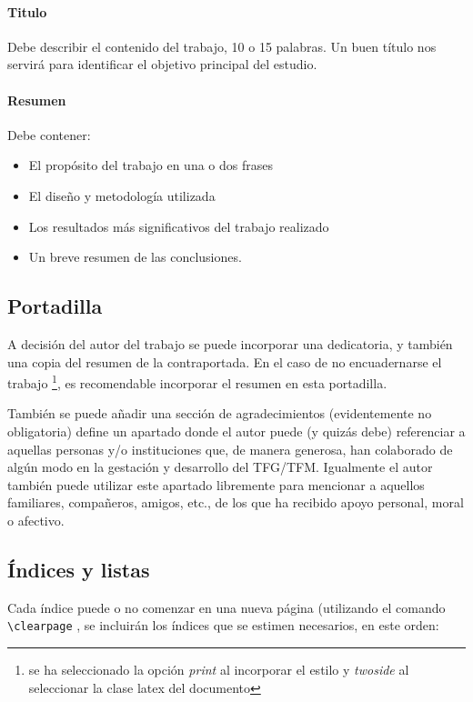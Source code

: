 \paragraph{Titulo}

Debe describir el contenido del trabajo, 10 o 15 palabras. Un buen título nos servirá para identificar el objetivo principal del estudio.

\paragraph{Resumen }
Debe contener:
\begin{itemize}
    \item El  propósito  del  trabajo  en  una  o  dos  frases
    \item El  diseño  y metodología  utilizada
    \item Los  resultados  más  significativos  del trabajo realizado 
    \item Un breve resumen de las conclusiones.
\end{itemize}


 \subsection{Portadilla}
A decisión del autor del trabajo se puede incorporar una dedicatoria, y también una copia del resumen de la contraportada. En el caso de no encuadernarse el trabajo \footnote{se ha seleccionado la opción \emph{print} al incorporar el estilo y \emph{twoside} al seleccionar la clase latex del documento}, es recomendable incorporar el resumen en esta portadilla.

También se puede añadir una  sección  de  agradecimientos  (evidentemente  no  obligatoria)  define  un apartado  donde  el autor  puede  (y  quizás  debe)  referenciar  a  aquellas  personas  y/o  instituciones  que,  de  manera generosa, han colaborado de algún modo en la gestación y desarrollo del TFG/TFM.
Igualmente el autor también  puede  utilizar  este  apartado libremente  para mencionar  a  aquellos  familiares,  compañeros, amigos, etc., de los que ha recibido apoyo personal, moral o afectivo. 

 \subsection{Índices y listas}

Cada índice puede o no  comenzar en una nueva página (utilizando el comando  \lstinline[language=enparrafo]!\clearpage! , se incluirán los índices que se estimen necesarios, en este orden:

